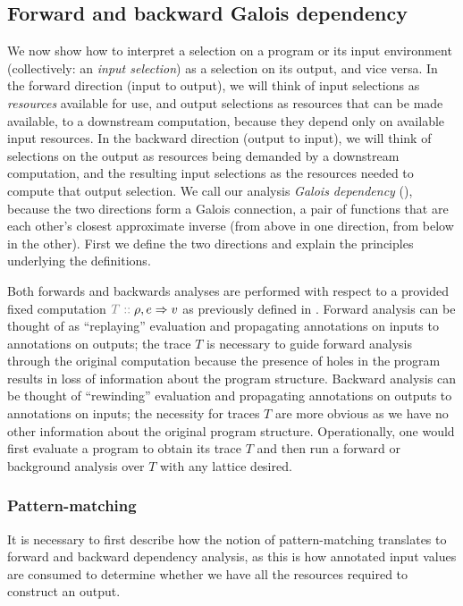 \subsection{Forward and backward Galois dependency}
\label{sec:data-dependencies:analyses}

We now show how to interpret a selection on a program or its input environment (collectively: an \emph{input selection}) as a selection on its output, and vice versa. In the forward direction (input to output), we will think of input selections as \emph{resources} available for use, and output selections as resources that can be made available, to a downstream computation, because they depend only on available input resources. In the backward direction (output to input), we will think of selections on the output as resources being demanded by a downstream computation, and the resulting input selections as the resources needed to compute that output selection. We call our analysis \emph{Galois dependency} (), because the two directions form a Galois connection, a pair of functions that are each other's closest approximate inverse (from above in one direction, from below in the other). First we define the two directions and explain the principles underlying the definitions.

Both forwards and backwards analyses are performed with respect to a provided fixed computation $\explVal{T}{\rho, e \evalR v}$ as previously defined in . Forward analysis can be thought of as ``replaying'' evaluation and propagating annotations on inputs to annotations on outputs; the trace $T$ is necessary to guide forward analysis through the original computation because the presence of holes in the program results in loss of information about the program structure. Backward analysis can be thought of ``rewinding'' evaluation and propagating annotations on outputs to annotations on inputs; the necessity for traces $T$ are more obvious as we have no other information about the original program structure. Operationally, one would first evaluate a program to obtain its trace $T$ and then run a forward or background analysis over $T$ with any lattice desired.

\subsubsection{Pattern-matching}

It is necessary to first describe how the notion of pattern-matching translates to forward and backward dependency analysis, as this is how annotated input values are consumed to determine whether we have all the resources required to construct an output.

